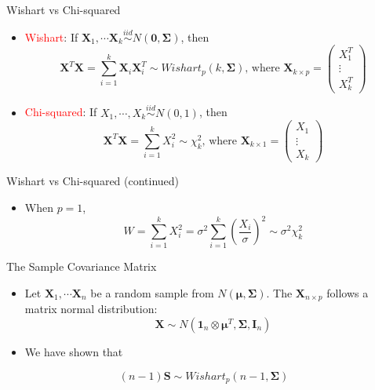 \documentclass[
  ignorenonframetext,
]{beamer}
\providecommand{\tightlist}{%
  \setlength{\itemsep}{0pt}\setlength{\parskip}{0pt}}
\begin{document}
\begin{frame}{Wishart vs Chi-squared}
\protect\hypertarget{wishart-vs-chi-squared}{}
\begin{itemize}
\item
  \textcolor{red}{Wishart}: If
  \(\mathbf X_1, \cdots \mathbf X_k \overset{iid}\sim N(\mathbf 0, \boldsymbol \Sigma)\),
  then
  \[\mathbf X^T \mathbf X =\sum_{i=1}^k \mathbf X_i\mathbf X_i^T \sim Wishart_p(k, \boldsymbol \Sigma) \mbox{, where } \mathbf X_{k\times p}=\begin{pmatrix}
  X_1^T\\ \vdots\\ X_k^T
  \end{pmatrix}
  \]
\item
  \textcolor{red}{Chi-squared}: If
  \(X_1, \cdots, X_k \overset{iid}\sim N(0,1)\), then\\
  \[\mathbf X^T\mathbf X=\sum_{i=1}^k X_i^2\sim \chi_k^2 \mbox{, where } \mathbf X_{k\times 1}= 
  \begin{pmatrix}
  X_1 \\ \vdots \\ X_k
  \end{pmatrix}\]
\end{itemize}
\end{frame}

\begin{frame}{Wishart vs Chi-squared (continued)}
\protect\hypertarget{wishart-vs-chi-squared-continued}{}
\begin{itemize}
\tightlist
\item
  When \(p=1\),
  \[W=\sum_{i=1}^k X_i^2 = \sigma^2 \sum_{i=1}^k \left(\frac{X_i}{\sigma} \right)^2\sim \sigma^2 \chi_k^2 \]
\end{itemize}
\end{frame}

\begin{frame}{The Sample Covariance Matrix}
\protect\hypertarget{the-sample-covariance-matrix}{}
\begin{itemize}
\item
  Let \(\mathbf X_1, \cdots \mathbf X_n\) be a random sample from
  \(N(\boldsymbol \mu, \boldsymbol \Sigma)\). The
  \(\mathbf X_{n\times p}\) follows a matrix normal distribution:
  \[\mathbf X \sim N(\mathbf 1_n \otimes \boldsymbol \mu^T, \boldsymbol \Sigma, \mathbf I_n)\]
\item
  We have shown that
\end{itemize}

\[(n-1)\mathbf S \sim Wishart_p(n-1, \boldsymbol\Sigma)\]
\end{frame}
\end{document}

